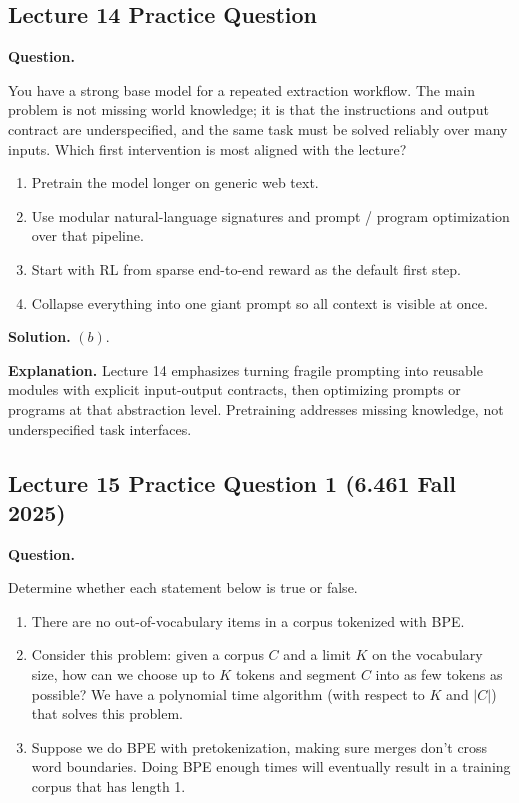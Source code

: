 \documentclass[10pt]{article}
\begin{document}
\subsection*{Lecture 14 Practice Question}
\textbf{Question.}

You have a strong base model for a repeated extraction workflow. The main problem is not missing
world knowledge; it is that the instructions and output contract are underspecified, and the same
task must be solved reliably over many inputs. Which first intervention is most aligned with the
lecture?
\begin{enumerate}
\item[(a)] Pretrain the model longer on generic web text.
\item[(b)] Use modular natural-language signatures and prompt / program optimization over that pipeline.
\item[(c)] Start with RL from sparse end-to-end reward as the default first step.
\item[(d)] Collapse everything into one giant prompt so all context is visible at once.
\end{enumerate}

\textbf{Solution.} \((b)\).

\textbf{Explanation.} Lecture 14 emphasizes turning fragile prompting into reusable modules with explicit input-output contracts, then optimizing prompts or programs at that abstraction level. Pretraining addresses missing knowledge, not underspecified task interfaces.

\subsection*{Lecture 15 Practice Question 1 (6.461 Fall 2025)}
\textbf{Question.}

Determine whether each statement below is true or false.
\begin{enumerate}
\item There are no out-of-vocabulary items in a corpus tokenized with BPE.
\item Consider this problem: given a corpus \(C\) and a limit \(K\) on the vocabulary size, how can we
choose up to \(K\) tokens and segment \(C\) into as few tokens as possible? We have a polynomial
time algorithm (with respect to \(K\) and \(|C|\)) that solves this problem.
\item Suppose we do BPE with pretokenization, making sure merges don't cross word boundaries.
Doing BPE enough times will eventually result in a training corpus that has length 1.
\end{enumerate}
\end{document}
